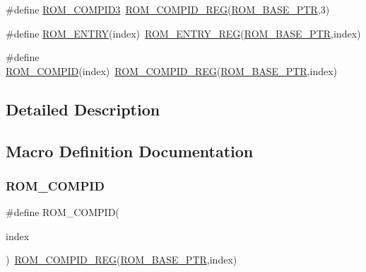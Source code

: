 \begin{DoxyCompactItemize}
\item 
\#define \hyperlink{group___r_o_m___register___accessor___macros_ga7789fe9cc0215fcd4cae71f04764e9f7}{R\+O\+M\+\_\+\+C\+O\+M\+P\+I\+D3}~\hyperlink{group___r_o_m___register___accessor___macros_gadf3bba37f4d1e368614a96a068c8c6c1}{R\+O\+M\+\_\+\+C\+O\+M\+P\+I\+D\+\_\+\+R\+EG}(\hyperlink{group___r_o_m___peripheral_ga5ad426d10b6832ca7012e8767113f686}{R\+O\+M\+\_\+\+B\+A\+S\+E\+\_\+\+P\+TR},3)
\item 
\#define \hyperlink{group___r_o_m___register___accessor___macros_ga069404bc9c62c5e1e8dcd239e6abbfcc}{R\+O\+M\+\_\+\+E\+N\+T\+RY}(index)~\hyperlink{group___r_o_m___register___accessor___macros_gab4e97748d1b7d5e8024f502e628709fa}{R\+O\+M\+\_\+\+E\+N\+T\+R\+Y\+\_\+\+R\+EG}(\hyperlink{group___r_o_m___peripheral_ga5ad426d10b6832ca7012e8767113f686}{R\+O\+M\+\_\+\+B\+A\+S\+E\+\_\+\+P\+TR},index)
\item 
\#define \hyperlink{group___r_o_m___register___accessor___macros_ga6049b92e3274bd0d699e6009eb0a24a1}{R\+O\+M\+\_\+\+C\+O\+M\+P\+ID}(index)~\hyperlink{group___r_o_m___register___accessor___macros_gadf3bba37f4d1e368614a96a068c8c6c1}{R\+O\+M\+\_\+\+C\+O\+M\+P\+I\+D\+\_\+\+R\+EG}(\hyperlink{group___r_o_m___peripheral_ga5ad426d10b6832ca7012e8767113f686}{R\+O\+M\+\_\+\+B\+A\+S\+E\+\_\+\+P\+TR},index)
\end{DoxyCompactItemize}


\subsection{Detailed Description}


\subsection{Macro Definition Documentation}
\mbox{\label{group___r_o_m___register___accessor___macros_ga6049b92e3274bd0d699e6009eb0a24a1}} 
\subsubsection{\texorpdfstring{R\+O\+M\+\_\+\+C\+O\+M\+P\+ID}{ROM\_COMPID}}
{\footnotesize\ttfamily \#define R\+O\+M\+\_\+\+C\+O\+M\+P\+ID(\begin{DoxyParamCaption}\item[{}]{index }\end{DoxyParamCaption})~\hyperlink{group___r_o_m___register___accessor___macros_gadf3bba37f4d1e368614a96a068c8c6c1}{R\+O\+M\+\_\+\+C\+O\+M\+P\+I\+D\+\_\+\+R\+EG}(\hyperlink{group___r_o_m___peripheral_ga5ad426d10b6832ca7012e8767113f686}{R\+O\+M\+\_\+\+B\+A\+S\+E\+\_\+\+P\+TR},index)}

